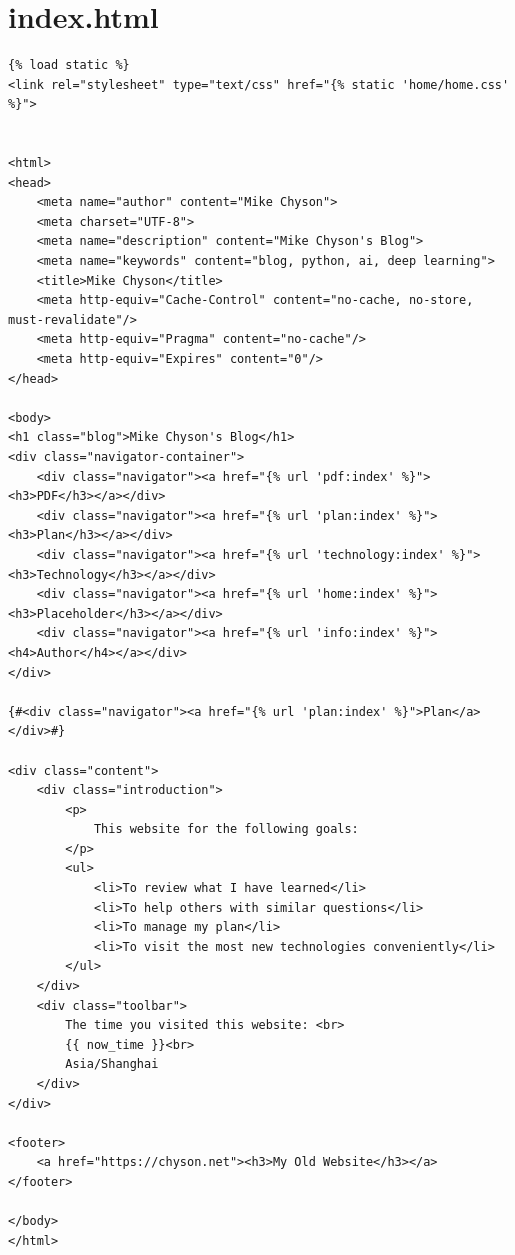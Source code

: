 \section{index.html}
\lstset{language=Html}
\begin{lstlisting}
{% load static %}
<link rel="stylesheet" type="text/css" href="{% static 'home/home.css' %}">


<html>
<head>
    <meta name="author" content="Mike Chyson">
    <meta charset="UTF-8">
    <meta name="description" content="Mike Chyson's Blog">
    <meta name="keywords" content="blog, python, ai, deep learning">
    <title>Mike Chyson</title>
    <meta http-equiv="Cache-Control" content="no-cache, no-store, must-revalidate"/>
    <meta http-equiv="Pragma" content="no-cache"/>
    <meta http-equiv="Expires" content="0"/>
</head>

<body>
<h1 class="blog">Mike Chyson's Blog</h1>
<div class="navigator-container">
    <div class="navigator"><a href="{% url 'pdf:index' %}"><h3>PDF</h3></a></div>
    <div class="navigator"><a href="{% url 'plan:index' %}"><h3>Plan</h3></a></div>
    <div class="navigator"><a href="{% url 'technology:index' %}"><h3>Technology</h3></a></div>
    <div class="navigator"><a href="{% url 'home:index' %}"><h3>Placeholder</h3></a></div>
    <div class="navigator"><a href="{% url 'info:index' %}"><h4>Author</h4></a></div>
</div>

{#<div class="navigator"><a href="{% url 'plan:index' %}">Plan</a></div>#}

<div class="content">
    <div class="introduction">
        <p>
            This website for the following goals:
        </p>
        <ul>
            <li>To review what I have learned</li>
            <li>To help others with similar questions</li>
            <li>To manage my plan</li>
            <li>To visit the most new technologies conveniently</li>
        </ul>
    </div>
    <div class="toolbar">
        The time you visited this website: <br>
        {{ now_time }}<br>
        Asia/Shanghai
    </div>
</div>

<footer>
    <a href="https://chyson.net"><h3>My Old Website</h3></a>
</footer>

</body>
</html>
\end{lstlisting}


